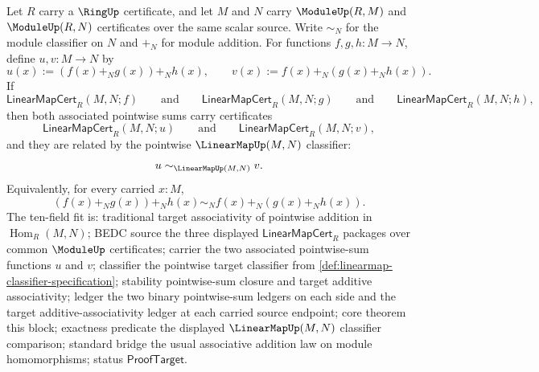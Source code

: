 \begin{theorem}
\label{thm:module-linearmap-pointwise-sum-associativity}
Let $R$ carry a $\RingUp$ certificate, and let $M$ and $N$ carry $\ModuleUp(R,M)$ and $\ModuleUp(R,N)$ certificates over the same scalar source. Write $\sim_N$ for the module classifier on $N$ and $+_N$ for module addition. For functions $f,g,h:M\to N$, define $u,v:M\to N$ by
$$
u(x):=(f(x)+_N g(x))+_N h(x),
\qquad
v(x):=f(x)+_N(g(x)+_N h(x)).
$$
If
$$
\mathsf{LinearMapCert}_R(M,N;f)
\qquad\text{and}\qquad
\mathsf{LinearMapCert}_R(M,N;g)
\qquad\text{and}\qquad
\mathsf{LinearMapCert}_R(M,N;h),
$$
then both associated pointwise sums carry certificates
$$
\mathsf{LinearMapCert}_R(M,N;u)
\qquad\text{and}\qquad
\mathsf{LinearMapCert}_R(M,N;v),
$$
and they are related by the pointwise $\LinearMapUp(M,N)$ classifier:
$$
u\sim_{\LinearMapUp(M,N)}v.
$$
Equivalently, for every carried $x:M$,
$$
(f(x)+_N g(x))+_N h(x)\sim_N f(x)+_N(g(x)+_N h(x)).
$$
The ten-field fit is: traditional target associativity of pointwise addition in $\operatorname{Hom}_R(M,N)$; BEDC source the three displayed $\mathsf{LinearMapCert}_R$ packages over common $\ModuleUp$ certificates; carrier the two associated pointwise-sum functions $u$ and $v$; classifier the pointwise target classifier from \autoref{def:linearmap-classifier-specification}; stability pointwise-sum closure and target additive associativity; ledger the two binary pointwise-sum ledgers on each side and the target additive-associativity ledger at each carried source endpoint; core theorem this block; exactness predicate the displayed $\LinearMapUp(M,N)$ classifier comparison; standard bridge the usual associative addition law on module homomorphisms; status $\mathsf{ProofTarget}$.
\end{theorem}
